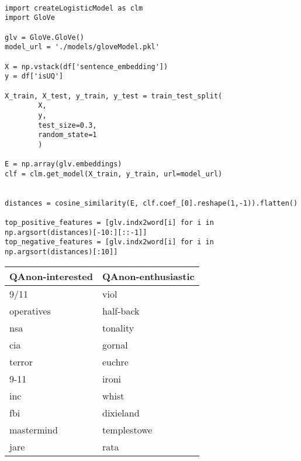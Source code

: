 \documentclass{article}
\begin{document}
\begin{verbatim}

import createLogisticModel as clm
import GloVe 

glv = GloVe.GloVe()
model_url = './models/gloveModel.pkl'

X = np.vstack(df['sentence_embedding'])
y = df['isUQ']

X_train, X_test, y_train, y_test = train_test_split(
        X, 
        y,
        test_size=0.3,
        random_state=1
        )

E = np.array(glv.embeddings)
clf = clm.get_model(X_train, y_train, url=model_url)


distances = cosine_similarity(E, clf.coef_[0].reshape(1,-1)).flatten()

top_positive_features = [glv.indx2word[i] for i in np.argsort(distances)[-10:][::-1]]
top_negative_features = [glv.indx2word[i] for i in np.argsort(distances)[:10]]
\end{verbatim}
\begin{center}
  \begin{tabular}[H]{|l|l|}
    \hline
    QAnon-interested&QAnon-enthusiastic\\
    \hline
    9/11&viol\\
    operatives&half-back\\
    nsa&tonality\\
    cia&gornal\\
    terror&euchre\\
    9-11&ironi\\
    inc&whist\\
    fbi&dixieland\\
    mastermind&templestowe\\
    jare&rata\\
    \hline
  \end{tabular}
\end{center}
\end{document}
